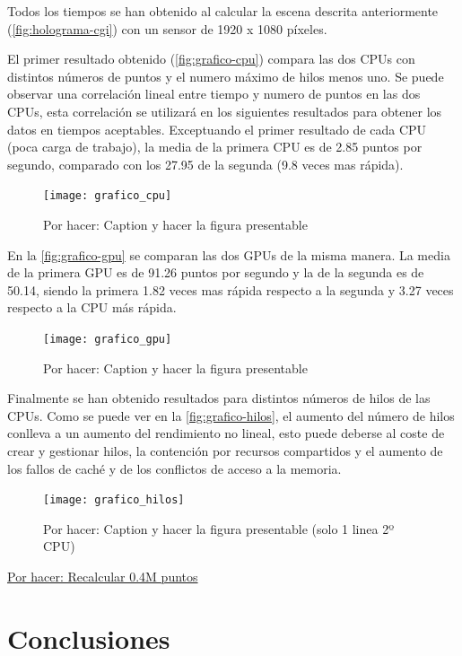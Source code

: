 \documentclass[10pt, a4paper]{article}
\begin{document}
Todos los tiempos se han obtenido al calcular la escena descrita anteriormente (\autoref{fig:holograma-cgi}) con un sensor de 1920 x 1080 píxeles. 

El primer resultado obtenido (\autoref{fig:grafico-cpu}) compara las dos CPUs con distintos números de puntos y el numero máximo de hilos menos uno. Se puede observar una correlación lineal entre tiempo y numero de puntos en las dos CPUs, esta correlación se utilizará en los siguientes resultados para obtener los datos en tiempos aceptables. Exceptuando el primer resultado de cada CPU (poca carga de trabajo), la media de la primera CPU es de 2.85 puntos por segundo, comparado con los 27.95 de la segunda (9.8 veces mas rápida). 

\begin{figure}[H]
    \centering
    \texttt{[image: grafico\_cpu]}
    \caption{Por hacer: Caption y hacer la figura presentable}
    \label{fig:grafico-cpu}
\end{figure}

En la \autoref{fig:grafico-gpu} se comparan las dos GPUs de la misma manera. La media de la primera GPU es de 91.26 puntos por segundo y la de la segunda es de 50.14, siendo la primera 1.82 veces mas rápida respecto a la segunda y 3.27 veces respecto a la CPU más rápida.

\begin{figure}[H]
    \centering
    \texttt{[image: grafico\_gpu]}
    \caption{Por hacer: Caption y hacer la figura presentable}
    \label{fig:grafico-gpu}
\end{figure}

Finalmente se han obtenido resultados para distintos números de hilos de las CPUs. Como se puede ver en la \autoref{fig:grafico-hilos}, el aumento del número de hilos conlleva a un aumento del rendimiento no lineal, esto puede deberse al coste de crear y gestionar hilos, la contención por recursos compartidos y el aumento de los fallos de caché y de los conflictos de acceso a la memoria.

\begin{figure}[H]
    \centering
    \texttt{[image: grafico\_hilos]}
    \caption{Por hacer: Caption y hacer la figura presentable (solo 1 linea 2º CPU)}
    \label{fig:grafico-hilos}
\end{figure}

\underline{Por hacer: Recalcular 0.4M puntos}

\section{Conclusiones}
\end{document}
